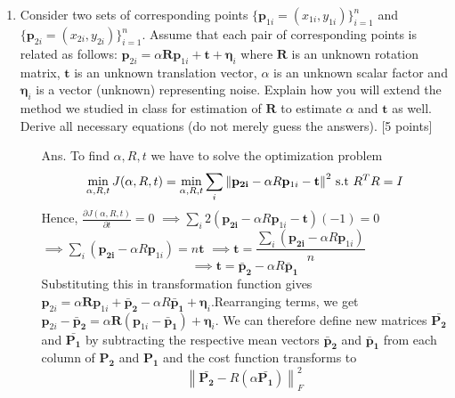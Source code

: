 \documentclass[11pt]{article}
\newcommand{\norm}[1]{\left\lVert#1\right\rVert}
\begin{document}
\begin{enumerate}
\item Consider two sets of corresponding points $\{\mathbf{p}_{1i} = (x_{1i},y_{1i})\}_{i=1}^{n}$ and $\{\mathbf{p}_{2i} = (x_{2i},y_{2i})\}_{i=1}^{n}$. Assume that each pair of corresponding points is related as follows: $\mathbf{p}_{2i} = \alpha \mathbf{R} \mathbf{p}_{1i} + \mathbf{t} + \mathbf{\eta}_i$ where $\mathbf{R}$ is an unknown rotation matrix, $\mathbf{t}$ is an unknown translation vector, $\alpha$ is an unknown scalar factor and $\mathbf{\eta}_i$ is a vector (unknown) representing noise. Explain how you will extend the method we studied in class for estimation of $\mathbf{R}$ to estimate $\alpha$ and $\mathbf{t}$ as well. Derive all necessary equations (do not merely guess the answers). \textsf{[5 points]}
\begin{itemize}
\item[Ans.] To find $\alpha,R,t$ we have to solve the optimization problem 
	\[
		\min_{\alpha,R,t} J(\alpha,R,t)= \min_{\alpha,R,t} \sum_i{\norm{\mathbf{{p}_{2i}} - \alpha R \mathbf{p}_{1i} - \mathbf{t}}}^2
		\textnormal{  s.t  } R^TR = I
	\]
	Hence, $\frac{\partial J(\alpha,R,t)}{\partial t}=0$\newline
	$\implies \sum_i 2(\mathbf{{p}_{2i}} - \alpha R \mathbf{p}_{1i} - \mathbf{t})(-1)=0$\newline
	$\implies \sum_i (\mathbf{{p}_{2i}} - \alpha R \mathbf{p}_{1i})=n\mathbf{t} $ \newline
	$\implies \mathbf{t}=  \dfrac{\sum_i (\mathbf{{p}_{2i}} - \alpha R \mathbf{p}_{1i})}{n} $ \newline
	 \begin{equation}
	\implies\mathbf{t}=  \mathbf{\bar{p}_2}-\alpha R\mathbf{\bar{p}_1}
\end{equation}	  \newline
	Substituting this in transformation function gives
	$\mathbf{p}_{2i} = \alpha \mathbf{R} \mathbf{p}_{1i} + \mathbf{\bar{p}_2}-\alpha R\mathbf{\bar{p}_1} + \mathbf{\eta}_i$.\newline Rearranging terms, we get	
	$\mathbf{p}_{2i} - \mathbf{\bar{p}_2} = \alpha \mathbf{R}( \mathbf{p}_{1i}-\mathbf{\bar{p}_1}) + \mathbf{\eta}_i$.\newline
	We can therefore define new matrices $\mathbf{\bar{P_2} }$ and $\mathbf{\bar{P_1}}$  by subtracting the respective mean vectors $\mathbf{\bar{p}_2}$ and $\mathbf{\bar{p}_1}$ from each column of $\mathbf{P_2} $ and $\mathbf{P_1}$ and the cost function transforms to  \begin{equation}
	\norm{\mathbf{\bar{P_2}} - R (\alpha \mathbf{\bar{P_1}})}_F^2

\end{equation}
\end{itemize}
\end{enumerate}
\end{document}

